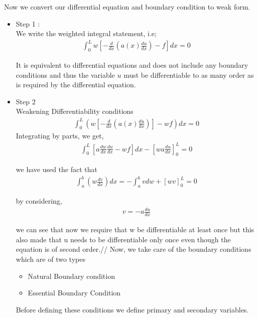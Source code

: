 	Now we convert our differential equation and boundary condition to weak form.\\
\begin{itemize}
	\item Step 1 : \\
	We write the weighted integral statement, i.e;\\
	\begin{eqnarray}
		\int_{0}^{L}  w \left[ -\frac{d}{dx} \left( a(x)\frac{du}{dx} \right) - f \right] dx = 0
	\end{eqnarray}

	It is equivalent to differential equations and does not include any boundary conditions and thus the variable $u$ must be differentiable to as many order as is required by the differential equation.
	\item Step 2\\
	Weakening Differentiability conditions
	\begin{eqnarray}
		\int_{0}^{L}  \left( w \left[ -\frac{d}{dx} \left( a(x)\frac{du}{dx} \right) \right] - wf \right)  dx = 0
	\end{eqnarray}
	Integrating by parts, we get,
	\begin{eqnarray}
		\int_{0}^{L} \left[ a \frac{dw}{dx} \frac{du}{dx} - wf \right] dx  - \left[ wa \frac{du}{dx}\right]_0^L = 0
	\end{eqnarray}


	we have used the fact that 
	\begin{eqnarray}
		\int_{a}^{b} \left( w \frac{dv}{dx} \right)dx  =  -\int_{a}^{b} v dw + \left[wv\right]_0^L = 0
	\end{eqnarray}

by considering,
	\begin{eqnarray}
		v = -a\frac{du}{dx}
	\end{eqnarray}

we can see that now we require that w be differentiable at least once but this also made that u needs to be differentiable only once even though the equation is of second order.//
Now, we take care of the boundary conditions which are of two types
\begin{itemize}
	\item Natural Boundary  condition
	\item Essential Boundary Condition 
\end{itemize}

Before defining these conditions we define primary and secondary variables.


\end{itemize}
